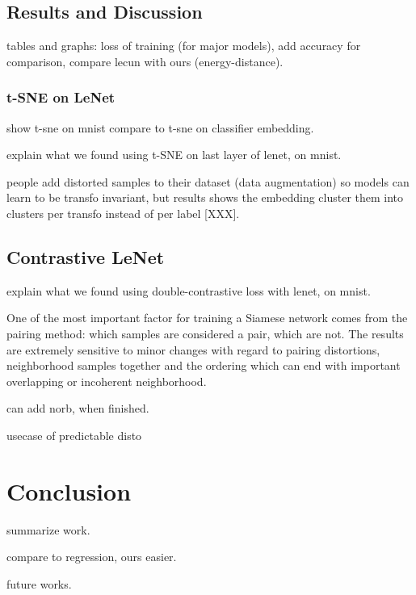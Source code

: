 \documentclass[a4paper,12pt]{report}
\begin{document}
\section{Results and Discussion}

tables and graphs: loss of training (for major models), add accuracy for comparison, compare lecun with ours (energy-distance).

\subsection{t-SNE on LeNet}
show t-sne on mnist
compare to t-sne on classifier embedding.

explain what we found using t-SNE on last layer of lenet, on mnist.

people add distorted samples to their dataset (data augmentation) so models can learn to be transfo invariant, but results shows the embedding cluster them into clusters per transfo instead of per label [XXX].

\section{Contrastive LeNet}
explain what we found using double-contrastive loss with lenet, on mnist.

One of the most important factor for training a Siamese network comes from the pairing method: which samples are considered a pair, which are not.
The results are extremely sensitive to minor changes with regard to pairing distortions, neighborhood samples together and the ordering which can end with important overlapping or incoherent neighborhood.

can add norb, when finished.

usecase of predictable disto


\chapter{Conclusion}

summarize work.

compare to regression, ours easier.

future works.

{}


\nocite{lecun2004learning}
\end{document}
